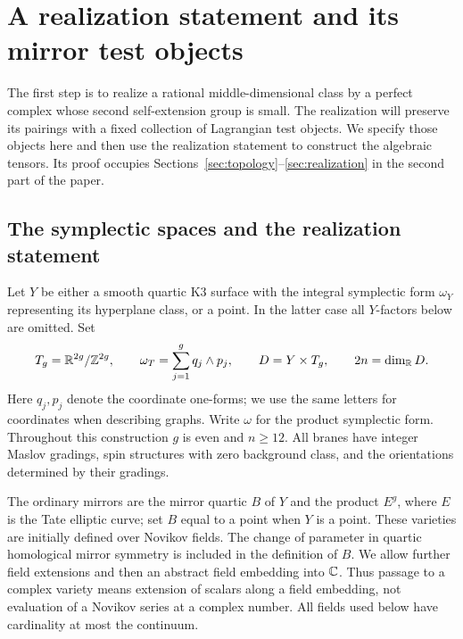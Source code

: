 \section{A realization statement and its mirror test objects}
\label{sec:setup}

The first step is to realize a rational middle-dimensional class by a
perfect complex whose second self-extension group is small.  The
realization will preserve its pairings with a fixed collection of
Lagrangian test objects.  We specify those objects here and then use the
realization statement to construct the algebraic tensors.  Its proof occupies
Sections~\ref{sec:topology}--\ref{sec:realization} in the second part
of the paper.

\subsection{The symplectic spaces and the realization statement}

Let $Y$ be either a smooth quartic K3 surface with the integral
symplectic form $\omega_Y$ representing its hyperplane class, or a point.
In the latter case all $Y$-factors below are omitted.  Set
\begin{equation}
 T_g=\mathbb R^{2g}/\mathbb Z^{2g},\qquad
 \omega_T=\sum_{j=1}^g q_j\wedge p_j,\qquad
 D=Y\times T_g,\qquad 2n=\dim_{\mathbb R}D.
 \label{setup:spaces}
\end{equation}
Here $q_j,p_j$ denote the coordinate one-forms; we use the same letters
for coordinates when describing graphs.  Write $\omega$ for the product
symplectic form.  Throughout this construction $g$ is even and $n\ge12$.
All branes have integer Maslov gradings, spin structures with zero
background class, and the orientations determined by their gradings.

The ordinary mirrors are the mirror quartic $B$ of $Y$ and the product
$E^g$, where $E$ is the Tate elliptic curve; set $B$ equal to a point
when $Y$ is a point.  These varieties are initially
defined over Novikov fields.  The change of parameter in quartic
homological mirror symmetry is included in the definition of $B$.
We allow further field extensions and then an abstract field embedding
into $\mathbb C$.  Thus passage to a complex variety means extension of scalars
along a field embedding, not evaluation of a Novikov series at a complex
number.  All fields used below have cardinality at most the continuum.


